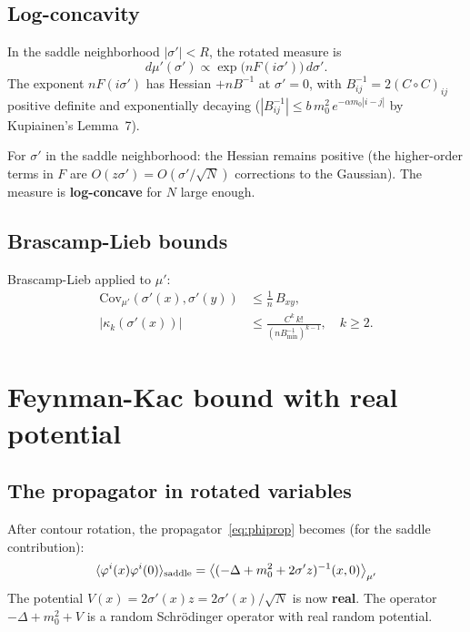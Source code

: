 \documentclass[12pt]{article}
\theoremstyle{definition}
\theoremstyle{remark}
\newcommand{\Cov}{\mathrm{Cov}}
\newcommand{\ph}{\varphi}
\begin{document}
\subsection{Log-concavity}

In the saddle neighborhood $|\sigma'|<R$, the rotated measure is
\begin{equation}
  d\mu'(\sigma') \propto \exp\bigl(nF(i\sigma')\bigr)\,d\sigma'.
\end{equation}
The exponent $nF(i\sigma')$ has Hessian $+nB^{-1}$ at $\sigma'=0$,
with $B^{-1}_{ij} = 2(C\circ C)_{ij}$ positive definite and
exponentially decaying ($|B^{-1}_{ij}| \le b\,m_0^2\,
e^{-\alpha m_0|i-j|}$ by Kupiainen's Lemma~7).

For $\sigma'$ in the saddle neighborhood: the Hessian remains
positive (the higher-order terms in $F$ are $O(z\sigma') = O(\sigma'/\sqrt{N})$
corrections to the Gaussian). The measure is \textbf{log-concave}
for $N$ large enough.

\subsection{Brascamp-Lieb bounds}

Brascamp-Lieb applied to $\mu'$:
\begin{align}
  \Cov_{\mu'}(\sigma'(x),\sigma'(y))
    &\le \frac{1}{n}\,B_{xy}, \\
  |\kappa_k(\sigma'(x))|
    &\le \frac{C^k\,k!}{(nB^{-1}_{\min})^{k-1}},
    \quad k \ge 2.
\end{align}

\section{Feynman-Kac bound with real potential}

\subsection{The propagator in rotated variables}

After contour rotation, the propagator~\eqref{eq:phiprop} becomes
(for the saddle contribution):
\begin{equation}
  \langle\ph^i(x)\ph^i(0)\rangle_{\rm saddle}
    = \bigl\langle(-\Delta+m_0^2+2\sigma' z)^{-1}(x,0)
      \bigr\rangle_{\mu'}
\end{equation}
The potential $V(x) = 2\sigma'(x)z = 2\sigma'(x)/\sqrt{N}$ is now
\textbf{real}. The operator $-\Delta + m_0^2 + V$ is a random
Schr\"odinger operator with real random potential.
\end{document}
